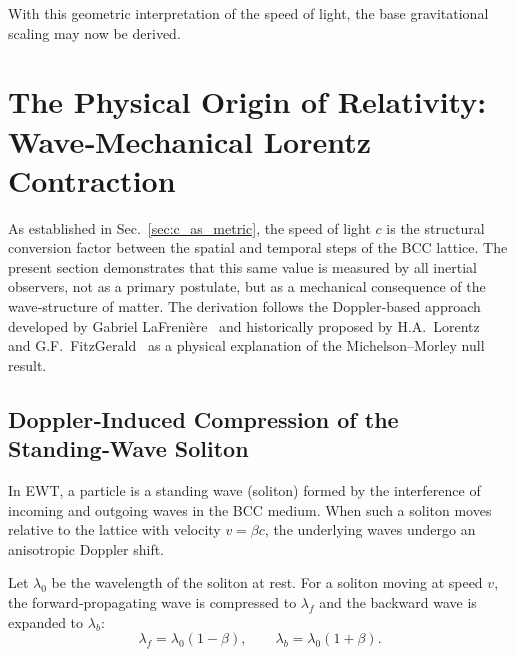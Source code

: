 \documentclass[10pt,a4paper]{article}
\begin{document}
With this geometric interpretation of the speed of light, the base gravitational scaling may now be derived.


\section{The Physical Origin of Relativity: Wave‑Mechanical Lorentz Contraction}
\label{sec:relativity_physical}

As established in Sec.~\ref{sec:c_as_metric}, the speed of light $c$ is the
structural conversion factor between the spatial and temporal steps of the
BCC lattice.  The present section demonstrates that this same value is
measured by all inertial observers, not as a primary postulate, but as a
mechanical consequence of the wave‑structure of matter.  The derivation
follows the Doppler‑based approach developed by Gabriel
LaFrenière~\cite{LaFreniere2000} and historically proposed by
H.A.~Lorentz~\cite{Lorentz1904} and G.F.~FitzGerald~\cite{FitzGerald1889} as a physical
explanation of the Michelson–Morley null result.

\subsection{Doppler‑Induced Compression of the Standing‑Wave Soliton}

In EWT, a particle is a standing wave (soliton) formed by the interference of
incoming and outgoing waves in the BCC medium.  When such a soliton moves
relative to the lattice with velocity $v = \beta c$, the underlying waves
undergo an anisotropic Doppler shift.  

Let $\lambda_0$ be the wavelength of the soliton at rest.  For a soliton
moving at speed $v$, the forward‑propagating wave is compressed to
$\lambda_f$ and the backward wave is expanded to $\lambda_b$:
\begin{equation}
	\lambda_f = \lambda_0 (1 - \beta), \qquad
	\lambda_b = \lambda_0 (1 + \beta).
\end{equation}
\end{document}
